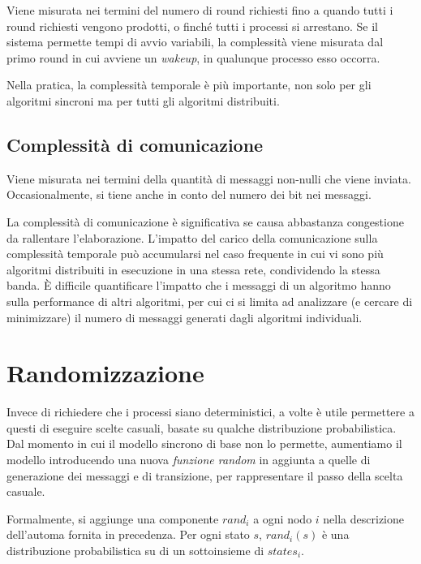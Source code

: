 \documentclass[italian,]{book}
\begin{document}
Viene misurata nei termini del numero di round richiesti fino a quando
tutti i round richiesti vengono prodotti, o finché tutti i processi si
arrestano. Se il sistema permette tempi di avvio variabili, la
complessità viene misurata dal primo round in cui avviene un
\emph{wakeup}, in qualunque processo esso occorra.

Nella pratica, la complessità temporale è più importante, non solo per
gli algoritmi sincroni ma per tutti gli algoritmi distribuiti.

\hypertarget{complessituxe0-di-comunicazione}{%
\subsection*{Complessità di
comunicazione}\label{complessituxe0-di-comunicazione}}

Viene misurata nei termini della quantità di messaggi non-nulli che
viene inviata. Occasionalmente, si tiene anche in conto del numero dei
bit nei messaggi.

La complessità di comunicazione è significativa se causa abbastanza
congestione da rallentare l'elaborazione. L'impatto del carico della
comunicazione sulla complessità temporale può accumularsi nel caso
frequente in cui vi sono più algoritmi distribuiti in esecuzione in una
stessa rete, condividendo la stessa banda. È difficile quantificare
l'impatto che i messaggi di un algoritmo hanno sulla performance di
altri algoritmi, per cui ci si limita ad analizzare (e cercare di
minimizzare) il numero di messaggi generati dagli algoritmi individuali.

\hypertarget{randomizzazione}{%
\section{Randomizzazione}\label{randomizzazione}}

Invece di richiedere che i processi siano deterministici, a volte è
utile permettere a questi di eseguire scelte casuali, basate su qualche
distribuzione probabilistica. Dal momento in cui il modello sincrono di
base non lo permette, aumentiamo il modello introducendo una nuova
\emph{funzione random} in aggiunta a quelle di generazione dei messaggi
e di transizione, per rappresentare il passo della scelta casuale.

Formalmente, si aggiunge una componente \(rand_i\) a ogni nodo \(i\)
nella descrizione dell'automa fornita in precedenza. Per ogni stato
\(s\), \(rand_i(s)\) è una distribuzione probabilistica su di un
sottoinsieme di \(states_i\).
\end{document}
